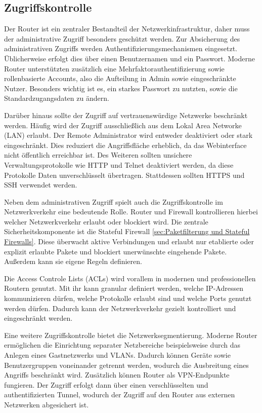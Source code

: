 	\subsection{Zugriffskontrolle}
	\label{sec:Zugriffskontrolle}
	Der Router ist ein zentraler Bestandteil der Netzwerkinfrastruktur, daher muss der administrative
	Zugriff besonders geschützt werden.
	Zur Absicherung des administrativen Zugriffs werden Authentifizierungsmechanismen eingesetzt.
	Üblicherweise erfolgt dies über einen Benutzernamen und ein Passwort. 
	Moderne Router unterstützten zusätzlich eine Mehrfaktorauthentifizierung sowie rollenbasierte Accounts, 
	also die Aufteilung in Admin sowie eingeschränkte Nutzer.
	Besonders wichtig ist es, ein starkes Passwort zu nutzten, sowie die Standardzugangsdaten zu ändern.
	
	Darüber hinaus sollte der Zugriff auf vertrauenswürdige Netzwerke beschränkt werden.
	Häufig wird der Zugriff ausschließlich aus dem Lokal Area Networke (LAN) erlaubt. 
	Der Remote Administrator wird entweder deaktiviert oder stark eingeschränkt. 
	Dies reduziert die Angriffsfläche erheblich, da das Webinterface nicht öffentlich erreichbar ist.
	Des Weiteren sollten unsichere Verwaltungsprotokolle wie HTTP und Telnet deaktiviert werden,
	da diese Protokolle Daten unverschlüsselt übertragen. Stattdessen sollten HTTPS und SSH verwendet werden.

	Neben dem administrativen Zugriff spielt auch die Zugriffskontrolle im Netzwerkverkehr eine bedeutende Rolle.
	Router und Firewall kontrollieren hierbei welcher Netzwerkverkehr erlaubt oder blockiert wird.
	Die zentrale Sicherheitskomponente ist die Stateful Firewall \ref{sec:Paketfilterung und Stateful Firewalls}. 
	Diese überwacht aktive Verbindungen und erlaubt nur etablierte oder explizit erlaubte Pakete
	und blockiert unerwünschte eingehende Pakete. Außerdem kann sie eigene Regeln definieren.

	Die Access Controle Lists (ACLs) wird vorallem in modernen und professionellen Routern genutzt.
	Mit ihr kann granular definiert werden, welche IP-Adressen kommunizieren dürfen, welche Protokolle erlaubt sind
	und welche Ports genutzt werden dürfen.
	Dadurch kann der Netzwerkverkehr gezielt kontrolliert und eingeschränkt werden.

	Eine weitere Zugriffskontrolle bietet die Netzwerksegmentierung. Moderne Router ermöglichen die Einrichtung 
	separater Netzbereiche beispielsweise durch das Anlegen eines Gastnetzwerks und VLANs. 
	Dadurch können Geräte sowie Benutzergruppen voneinander getrennt werden, wodurch die Ausbreitung eines Angriffs beschränkt wird.
	Zusätzlich können Router als VPN-Endpunkte fungieren. 
	Der Zugriff erfolgt dann über einen verschlüsselten und authentifizierten Tunnel,
	wodurch der Zugriff auf den Router aus externen Netzwerken abgesichert ist. 

